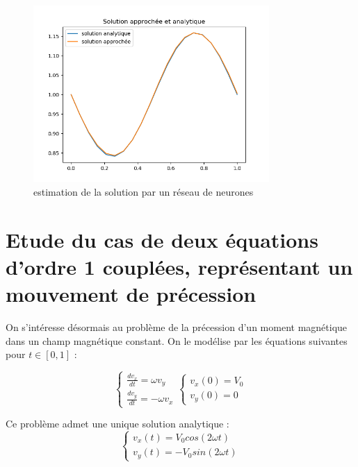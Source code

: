 \documentclass{article}
\begin{document}
\begin{figure}
\centering
\includegraphics[width=0.8\textwidth]{resultat_NN.png}
\caption{\label{fig:resultat_NN}estimation de la solution par un réseau de neurones}
\end{figure}


\section{Etude du cas de deux équations d'ordre 1 couplées, représentant un mouvement de précession}
On s'intéresse désormais au problème de la précession d'un moment magnétique dans un champ magnétique constant. On le modélise par les équations suivantes pour $t\in [0,1]$ :

\begin{equation}
\left\{
    \begin{array}{ll}
        \frac{dv_x}{dt} = \omega v_y \\
        \frac{dv_y}{dt} = -\omega v_x
    \end{array}
\right.
\left\{
    \begin{array}{ll}
        v_x(0) = V_0 \\
        v_y(0) = 0
    \end{array}
\right.
\label{eq:équations couplées}
\end{equation}

Ce problème admet une unique solution analytique :
\begin{equation}
\left\{
    \begin{array}{ll}
        v_x(t) = V_0 cos(2\omega t) \\
        v_y(t) = -V_0 sin(2\omega t)
    \end{array}
\right.
\label{eq:solution analytique couplée}
\end{equation}
\end{document}
